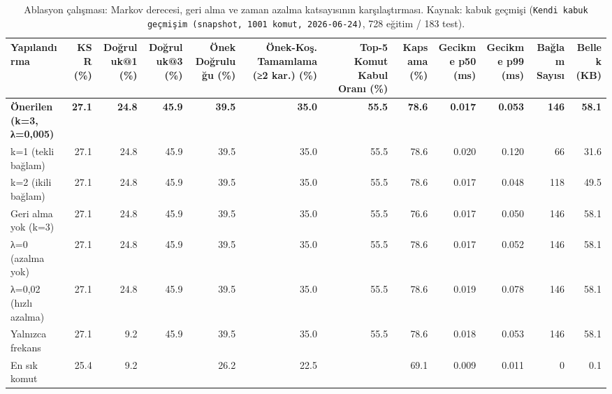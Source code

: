 \begin{table}[htbp]
  \centering
  \caption{Ablasyon çalışması: Markov derecesi, geri alma ve zaman azalma katsayısının karşılaştırması. Kaynak: kabuk geçmişi (\texttt{Kendi kabuk geçmişim (snapshot, 1001 komut, 2026-06-24)}, 728 eğitim / 183 test).}
  \label{tab:ablation}
  \begin{tabular}{lrrrrrrrrrrr}
    \toprule
    Yapılandırma & KSR (\%) & Doğruluk@1 (\%) & Doğruluk@3 (\%) & Önek Doğruluğu (\%) & Önek-Koş. Tamamlama (≥2 kar.) (\%) & Top-5 Komut Kabul Oranı (\%) & Kapsama (\%) & Gecikme p50 (ms) & Gecikme p99 (ms) & Bağlam Sayısı & Bellek (KB) \\
    \midrule
    \textbf{Önerilen (k=3, λ=0,005)} & \textbf{27.1} & \textbf{24.8} & \textbf{45.9} & \textbf{39.5} & \textbf{35.0} & \textbf{55.5} & \textbf{78.6} & \textbf{0.017} & \textbf{0.053} & \textbf{146} & \textbf{58.1} \\
    k=1 (tekli bağlam) & 27.1 & 24.8 & 45.9 & 39.5 & 35.0 & 55.5 & 78.6 & 0.020 & 0.120 & 66 & 31.6 \\
    k=2 (ikili bağlam) & 27.1 & 24.8 & 45.9 & 39.5 & 35.0 & 55.5 & 78.6 & 0.017 & 0.048 & 118 & 49.5 \\
    Geri alma yok (k=3) & 27.1 & 24.8 & 45.9 & 39.5 & 35.0 & 55.5 & 76.6 & 0.017 & 0.050 & 146 & 58.1 \\
    λ=0 (azalma yok) & 27.1 & 24.8 & 45.9 & 39.5 & 35.0 & 55.5 & 78.6 & 0.017 & 0.052 & 146 & 58.1 \\
    λ=0,02 (hızlı azalma) & 27.1 & 24.8 & 45.9 & 39.5 & 35.0 & 55.5 & 78.6 & 0.019 & 0.078 & 146 & 58.1 \\
    Yalnızca frekans & 27.1 & 9.2 & 45.9 & 39.5 & 35.0 & 55.5 & 78.6 & 0.018 & 0.053 & 146 & 58.1 \\
    En sık komut & 25.4 & 9.2 &  & 26.2 & 22.5 &  & 69.1 & 0.009 & 0.011 & 0 & 0.1 \\
    \bottomrule
  \end{tabular}
\end{table}
